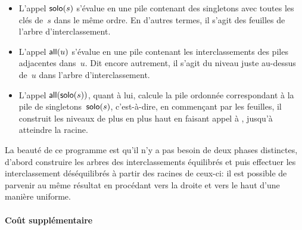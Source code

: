 \begin{itemize}

  \item L'appel \(\textsf{solo}(s)\) s'évalue en
    une pile contenant des singletons avec toutes les clés de~\(s\)
    dans le même ordre. En d'autres termes, il s'agit des feuilles de
    l'arbre d'interclassement.

  \item L'appel \(\textsf{all}(u)\) s'évalue en
    une pile contenant les interclassements des piles adjacentes
    dans~\(u\). Dit encore autrement, il s'agit du niveau juste
    au-dessus de~\(u\) dans l'arbre d'interclassement.

  \item L'appel \(\textsf{all}(\textsf{solo}(s))\), quant à lui, calcule la
    pile ordonnée correspondant à la pile de
    singletons~\(\textsf{solo}(s)\), c'est-à-dire, en commençant par les
    feuilles, il construit les niveaux de plus en plus haut en faisant
    appel à , jusqu'à atteindre la
    racine.

\end{itemize}
La beauté de ce programme est qu'il n'y a pas besoin de deux phases
distinctes, d'abord construire les arbres des interclassements
équilibrés et puis effectuer les interclassement déséquilibrés à
partir des racines de ceux-ci: il est possible de parvenir au même
résultat en procédant vers la droite et vers le haut d'une manière
uniforme.

\paragraph{Coût supplémentaire}


